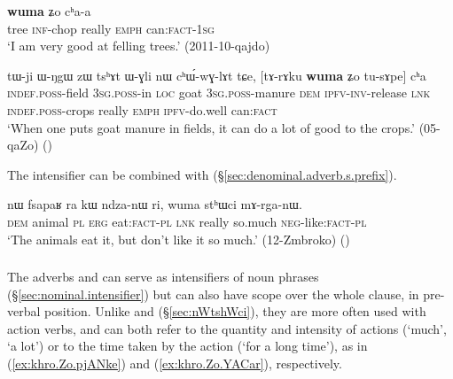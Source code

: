 \begin{exe}
\ex \label{ex:wuma.Zo.chaa}
\gll [si kɤ-pʰaʁ] \textbf{wuma} ʑo cʰa-a \\
tree \textsc{inf}-chop really \textsc{emph} can:\textsc{fact}-\textsc{1sg} \\
\glt `I am very good at felling trees.' (2011-10-qajdo)
\end{exe}

\begin{exe}
\ex \label{ex:wuma.tusApe.cha}
\gll tɯ-ji ɯ-ŋgɯ zɯ tsʰɤt ɯ-ɣli nɯ cʰɯ́-wɣ-lɤt tɕe, [tɤ-rɤku \textbf{wuma} ʑo tu-sɤpe] cʰa \\
\textsc{indef}.\textsc{poss}-field \textsc{3sg}.\textsc{poss}-in \textsc{loc} goat \textsc{3sg}.\textsc{poss}-manure \textsc{dem} \textsc{ipfv}-\textsc{inv}-release \textsc{lnk} \textsc{indef}.\textsc{poss}-crops really \textsc{emph} \textsc{ipfv}-do.well can:\textsc{fact} \\
\glt `When one puts goat manure in fields, it can do a lot of good to the crops.' (05-qaZo)
()
\end{exe}

The intensifier  can be combined with  (§\ref{sec:denominal.adverb.s.prefix}).  

\begin{exe}
\ex \label{ex:wuma.sthWci}
\gll nɯ fsapaʁ ra kɯ ndza-nɯ ri, wuma stʰɯci mɤ-rga-nɯ. \\
\textsc{dem} animal \textsc{pl} \textsc{erg} eat:\textsc{fact}-\textsc{pl} \textsc{lnk} really so.much \textsc{neg}-like:\textsc{fact}-\textsc{pl} \\
\glt `The animals eat it, but don't like it so much.' (12-Zmbroko)
()
\end{exe}
 
\subsubsection{} \label{sec:khro}
The adverbs  and  can serve as intensifiers of noun phrases (§\ref{sec:nominal.intensifier}) but can also have scope over the whole clause, in pre-verbal position. Unlike  and  (§\ref{sec:nWtshWci}), they are more often used with action verbs, and can both refer to the quantity and intensity of actions (`much', `a lot') or to the time taken by the action (`for a long time'), as in (\ref{ex:khro.Zo.pjANke}) and (\ref{ex:khro.Zo.YACar}), respectively.

